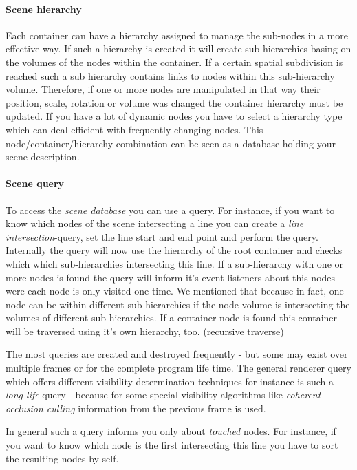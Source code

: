 \paragraph{Scene hierarchy}
Each container can have a hierarchy assigned to manage the sub-nodes in a more effective way. If such a hierarchy is created it will create sub-hierarchies basing on the volumes of the nodes within the container. If a certain spatial subdivision is reached such a sub hierarchy contains links to nodes within this sub-hierarchy volume. Therefore, if one or more nodes are manipulated in that way their position, scale, rotation or volume was changed the container hierarchy must be updated. If you have a lot of dynamic nodes you have to select a hierarchy type which can deal efficient with frequently changing nodes. This node/container/hierarchy combination can be seen as a database holding your scene description.


\paragraph{Scene query}
To access the \emph{scene database} you can use a query. For instance, if you want to know which nodes of the scene intersecting a line you can create a \emph{line intersection}-query, set the line start and end point and perform the query. Internally the query will now use the hierarchy of the root container and checks which which sub-hierarchies intersecting this line. If a sub-hierarchy with one or more nodes is found the query will inform it's event listeners about this nodes - were each node is only visited one time. We mentioned that because in fact, one node can be within different sub-hierarchies if the node volume is intersecting the volumes of different sub-hierarchies. If a container node is found this container will be traversed using it's own hierarchy, too. (recursive traverse)

The most queries are created and destroyed frequently - but some may exist over multiple frames or for the complete program life time. The general renderer query which offers different visibility determination techniques for instance is such a \emph{long life} query - because for some special visibility algorithms like \emph{coherent occlusion culling} information from the previous frame is used.

In general such a query informs you only about \emph{touched} nodes. For instance, if you want to know which node is the first intersecting this line you have to sort the resulting nodes by self.


